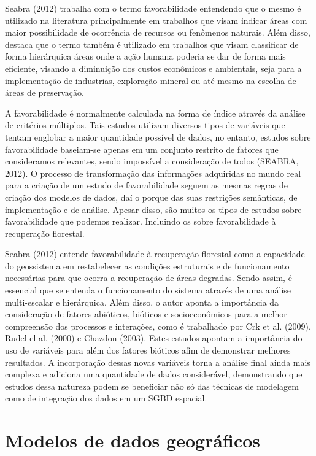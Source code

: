 	 Seabra (2012)\cite{SEABRA} trabalha com o termo favorabilidade entendendo que o mesmo é utilizado na literatura principalmente em trabalhos que visam indicar áreas com maior possibilidade de ocorrência de recursos ou fenômenos naturais. Além disso, destaca que o termo também é utilizado em trabalhos que visam classificar de forma hierárquica áreas onde a ação humana poderia se dar de forma mais eficiente, visando a diminuição dos custos econômicos e ambientais, seja para a implementação de industrias, exploração mineral ou até mesmo na escolha de áreas de preservação.
	 
	 A favorabilidade é normalmente calculada na forma de índice através da análise de critérios múltiplos. Tais estudos utilizam diversos tipos de variáveis que tentam englobar a maior quantidade possível de dados, no entanto, estudos sobre favorabilidade baseiam-se apenas em um conjunto restrito de fatores que consideramos relevantes, sendo impossível a consideração de todos (SEABRA, 2012)\cite{SEABRA}. O processo de transformação das informações adquiridas no mundo real para a criação de um estudo de favorabilidade seguem as mesmas regras de criação dos modelos de dados, daí o porque das suas restrições semânticas, de implementação e de análise. Apesar disso, são muitos os tipos de estudos sobre favorabilidade que podemos realizar. Incluindo os sobre favorabilidade à recuperação florestal.
	 
	 Seabra (2012)\cite{SEABRA} entende favorabilidade à recuperação florestal como a capacidade do geossistema em restabelecer as condições estruturais e de funcionamento necessárias para que ocorra a recuperação de áreas degradas. Sendo assim, é essencial que se entenda o funcionamento do sistema através de uma análise multi-escalar e hierárquica. Além disso, o autor aponta a importância da consideração de fatores abióticos, bióticos e socioeconômicos para a melhor compreensão dos processos e interações, como é trabalhado por Crk et al. (2009)\cite{CRK_etal09}, Rudel el al. (2000)\cite{RUDEL_etal00} e Chazdon (2003)\cite{CHAZDON}. Estes estudos apontam a importância do uso de variáveis para além dos fatores bióticos afim de demonstrar melhores resultados. A incorporação dessas novas variáveis torna a análise final ainda mais complexa e adiciona uma quantidade de dados considerável, demonstrando que estudos dessa natureza podem se beneficiar não só das técnicas de modelagem como de integração dos dados em um SGBD espacial.
	 
	 \section{Modelos de dados geográficos}
	 
